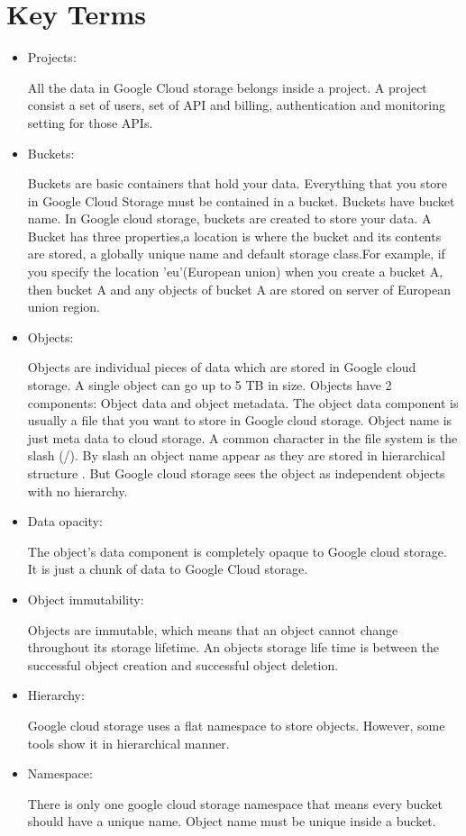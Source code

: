 \documentclass[9pt,twocolumn,twoside]{styles/osajnl}
\begin{document}
\section{Key Terms}
\begin{itemize}


\item Projects: 

All the data in Google Cloud storage belongs inside a project. A project consist a set of users, set of API and billing, authentication and monitoring setting for those APIs.\cite{www-google-cloud-storage} 


\item Buckets:

Buckets are basic containers that hold your data. Everything that you store in Google Cloud Storage must be contained in a bucket. Buckets have bucket name. In Google cloud storage, buckets are created to store your data. A Bucket has three properties,a location is where the bucket and its contents are stored, a globally unique name and default storage class.For example, if you specify the location 'eu'(European union)  when you create a bucket A, then bucket A and any objects of bucket A are stored on server of European union region. 


\item Objects:

Objects are individual pieces of data which are stored in Google cloud storage. A single object can go up to 5 TB in size. Objects have 2 components: Object data and object metadata. The object data component is usually a file that you want to store in Google cloud storage.
Object name is just meta data to cloud storage. A common character in the file system is the slash (/). By slash an object name appear as they are stored in hierarchical structure . But Google cloud storage sees the object as independent objects with no hierarchy.
 

\item Data opacity: 

The object’s data component is completely opaque to Google cloud storage. It is just a chunk of data to Google Cloud storage.

\item Object immutability: 

Objects are immutable, which means that an object cannot change throughout its storage lifetime. An objects storage life time is between the successful object creation and successful object deletion. 
 
\item Hierarchy:

Google cloud storage uses a flat namespace to store objects. However, some tools show it in hierarchical manner.
 
\item Namespace:

There is only one google cloud storage namespace that means every bucket should have a unique name. Object name must be unique inside a bucket.

\end{itemize}
\end{document}
